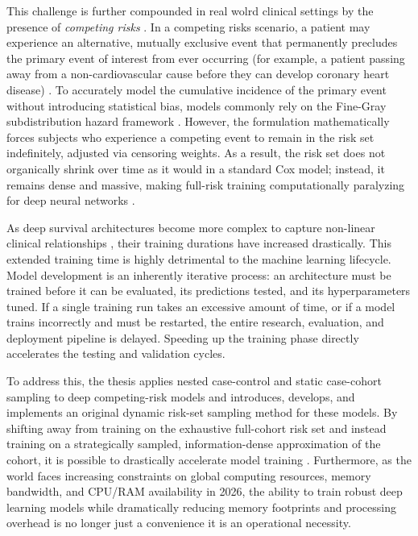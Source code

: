 \documentclass[a4paper,twoside,12pt]{report}
\begin{document}
This challenge is further compounded in real wolrd clinical settings by the presence of \textit{competing risks} \citep{latouche2013competing}. In a competing risks scenario, a patient may experience an alternative, mutually exclusive event that permanently precludes the primary event of interest from ever occurring (for example, a patient passing away from a non-cardiovascular cause before they can develop coronary heart disease) \citep{andersen2012competing}. To accurately model the cumulative incidence of the primary event without introducing statistical bias, models commonly rely on the Fine-Gray subdistribution hazard framework \citep{FineGray1999}. However, the \cite{FineGray1999} formulation mathematically forces subjects who experience a competing event to remain in the risk set indefinitely, adjusted via censoring weights. As a result, the risk set does not organically shrink over time as it would in a standard Cox model; instead, it remains dense and massive, making full-risk training computationally paralyzing for deep neural networks \citep{Katzman2018, Lee2018}.

As deep survival architectures become more complex to capture non-linear clinical relationships \citep{kvamme2019}, their training durations have increased drastically. This extended training time is highly detrimental to the machine learning lifecycle. Model development is an inherently iterative process: an architecture must be trained before it can be evaluated, its predictions tested, and its hyperparameters tuned. If a single training run takes an excessive amount of time, or if a model trains incorrectly and must be restarted, the entire research, evaluation, and deployment pipeline is delayed. Speeding up the training phase directly accelerates the testing and validation cycles.

To address this, the thesis applies nested case-control and static case-cohort sampling to deep competing-risk models and introduces, develops, and implements an original dynamic risk-set sampling method for these models. By shifting away from training on the exhaustive full-cohort risk set and instead training on a strategically sampled, information-dense approximation of the cohort, it is possible to drastically accelerate model training \citep{Breslow1974, Prentice1986, Borgan2000}. Furthermore, as the world faces increasing constraints on global computing resources, memory bandwidth, and CPU/RAM availability in 2026, the ability to train robust deep learning models while dramatically reducing memory footprints and processing overhead is no longer just a convenience it is an operational necessity.
\end{document}
